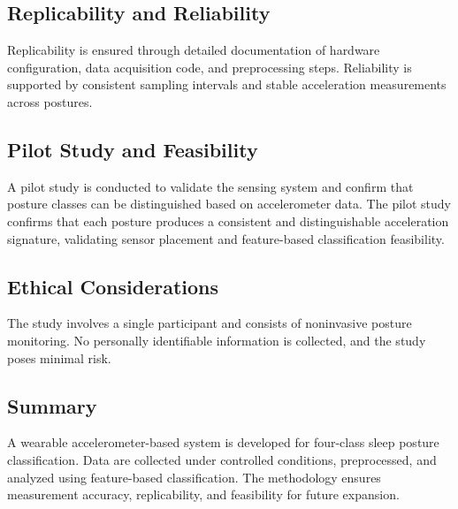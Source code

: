 \documentclass[conference]{IEEEtran}
\begin{document}
\subsection{Replicability and Reliability}

Replicability is ensured through detailed documentation of hardware configuration, data acquisition code, and preprocessing steps. Reliability is supported by consistent sampling intervals and stable acceleration measurements across postures.

\subsection{Pilot Study and Feasibility}

A pilot study is conducted to validate the sensing system and confirm that posture classes can be distinguished based on accelerometer data. The pilot study confirms that each posture produces a consistent and distinguishable acceleration signature, validating sensor placement and feature-based classification feasibility.

\subsection{Ethical Considerations}

The study involves a single participant and consists of noninvasive posture monitoring. No personally identifiable information is collected, and the study poses minimal risk.

\subsection{Summary}

A wearable accelerometer-based system is developed for four-class sleep posture classification. Data are collected under controlled conditions, preprocessed, and analyzed using feature-based classification. The methodology ensures measurement accuracy, replicability, and feasibility for future expansion.
\end{document}
